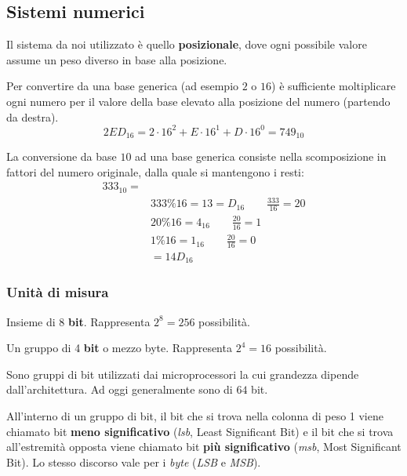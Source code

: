 \subsection{Sistemi numerici}
Il sistema da noi utilizzato è quello \textbf{posizionale}, dove ogni possibile valore assume un peso diverso in base alla posizione.
\begin{proposition}
	Per convertire da una base generica (ad esempio $2$ o $16$) è sufficiente moltiplicare ogni numero per il valore della base elevato alla posizione del numero (partendo da destra).
	\begin{equation*}
		2ED_{16} = 2 \cdot 16^2 + E \cdot 16^1 + D \cdot 16^0 = 749_{10}
	\end{equation*}
\end{proposition}

\begin{proposition}
	La conversione da base $10$ ad una base generica consiste nella scomposizione in fattori del numero originale, dalla quale si mantengono i resti:
	\begin{align*}
		333_{10} = \\
		&333 \% 16 = 13 = D_{16} \quad\quad \frac{333}{16} = 20\\
		& 20 \% 16 = 4_{16} \quad\quad \frac{20}{16} = 1 \\
		& 1 \% 16 = 1_{16} \quad\quad \frac{20}{16} = 0 \\
		& = 14D_{16}
	\end{align*}
\end{proposition}

\subsubsection{Unità di misura}
\begin{definition}[Byte]
	Insieme di 8 \textbf{bit}. Rappresenta $2^8=256$ possibilità.
\end{definition}
\begin{definition}[Nibble]
	Un gruppo di 4 \textbf{bit} o mezzo byte. Rappresenta $2^4=16$ possibilità.
\end{definition}
\begin{definition}[Word]
	Sono gruppi di bit utilizzati dai microprocessori la cui grandezza dipende dall'architettura. Ad oggi generalmente sono di $64$ bit.
\end{definition}
\begin{observation}
	All’interno di un gruppo di bit, il bit che si trova nella colonna di peso 1 viene chiamato bit \textbf{meno significativo} (\textit{lsb}, Least Significant Bit) e il bit che si
	trova all’estremità opposta viene chiamato bit \textbf{più significativo} (\textit{msb}, Most Significant Bit). Lo stesso discorso vale per i \textit{byte} (\textit{LSB} e \textit{MSB}).
\end{observation}

